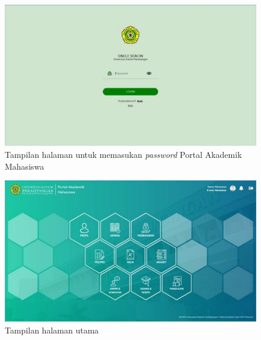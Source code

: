\begin{enumerate}
\begin{itemize}
		\begin{figure}[H]
			\centering
			\includegraphics[scale=0.7]{Gambar/pass2018.jpg}
			\caption{Tampilan halaman untuk memasukan \textit{password} Portal Akademik Mahasiswa} 
			\label{fig:pass_2018}
		\end{figure}
		
		\begin{figure}[H]
			\centering
			\includegraphics[scale=0.7]{Gambar/frs2018.jpg}
			\caption{Tampilan halaman utama} 
			\label{fig:frs_2018}
		\end{figure}
	\end{itemize}


\end{enumerate}
